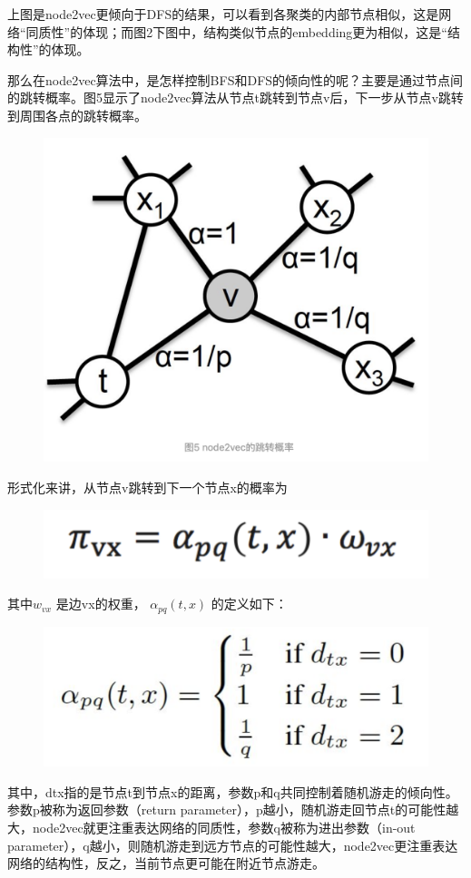 \documentclass[12pt]{article}
\begin{document}
\begin{framed}
上图是node2vec更倾向于DFS的结果，可以看到各聚类的内部节点相似，这是网络“同质性”的体现；而图2下图中，结构类似节点的embedding更为相似，这是“结构性”的体现。
\end{framed}

那么在node2vec算法中，是怎样控制BFS和DFS的倾向性的呢？主要是通过节点间的跳转概率。图5显示了node2vec算法从节点t跳转到节点v后，下一步从节点v跳转到周围各点的跳转概率。
\begin{figure}[H]
    \centering
    \includegraphics[width=.4\textwidth]{fig/Graph_Embedding_Node2Vec_Trans_Prob.png}
\end{figure}

形式化来讲，从节点v跳转到下一个节点x的概率为
\begin{figure}[H]
    \centering
    \includegraphics[width=.6\textwidth]{fig/Graph_Embedding_Node2Vec_Trans_Prob_2.png}
\end{figure}

其中$w_{vx}$ 是边vx的权重， $\alpha_{pq}(t,x)$ 的定义如下：
\begin{figure}[H]
    \centering
    \includegraphics[width=.6\textwidth]{fig/Graph_Embedding_Node2Vec_Trans_Prob_3.png}
\end{figure}

其中，dtx指的是节点t到节点x的距离，参数p和q共同控制着随机游走的倾向性。参数p被称为返回参数（return parameter），p越小，随机游走回节点t的可能性越大，node2vec就更注重表达网络的同质性，参数q被称为进出参数（in-out parameter），q越小，则随机游走到远方节点的可能性越大，node2vec更注重表达网络的结构性，反之，当前节点更可能在附近节点游走。
\end{document}
